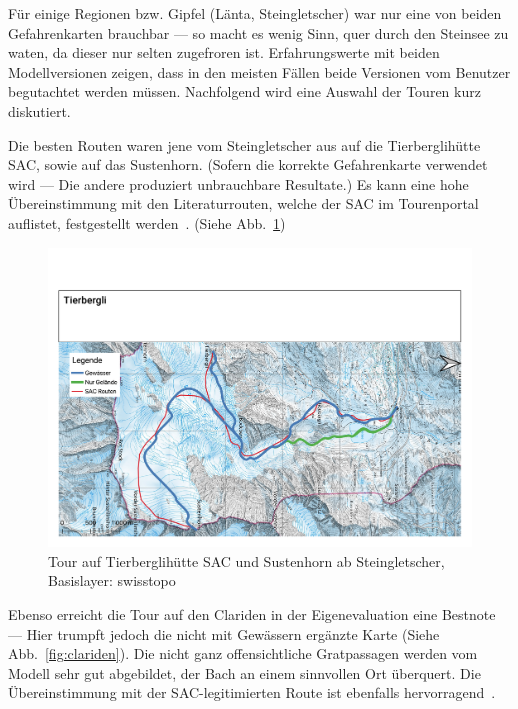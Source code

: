 Für einige Regionen bzw. Gipfel (Länta, Steingletscher) war nur eine von beiden Gefahrenkarten brauchbar --- so macht es wenig Sinn, quer durch den Steinsee zu waten, da dieser nur selten zugefroren ist. Erfahrungswerte mit beiden Modellversionen zeigen, dass in den meisten Fällen beide Versionen vom Benutzer begutachtet werden müssen.
Nachfolgend wird eine Auswahl der Touren kurz diskutiert.

Die besten Routen waren jene vom Steingletscher aus auf die Tierberglihütte SAC, sowie auf das Sustenhorn. (Sofern die korrekte Gefahrenkarte verwendet wird --- Die andere produziert unbrauchbare Resultate.) Es kann eine hohe Übereinstimmung mit den Literaturrouten, welche der SAC im Tourenportal auflistet, festgestellt werden~\cite{mmzentralch}. (Siehe Abb.\ \ref{fig:tierbergli})

\begin{figure}[ht]
  \centering
  \includegraphics[page=1,width=.9\linewidth]{./../evaluation/PDFs/Tierbergli.pdf}
  \caption{Tour auf Tierberglihütte SAC und Sustenhorn ab Steingletscher, \\Basislayer: swisstopo}\label{fig:tierbergli}
\end{figure}


Ebenso erreicht die Tour auf den Clariden in der Eigenevaluation eine Bestnote --- Hier trumpft jedoch die nicht mit Gewässern ergänzte Karte (Siehe Abb.\ \ref{fig:clariden}). Die nicht ganz offensichtliche Gratpassagen werden vom Modell sehr gut abgebildet, der Bach an einem sinnvollen Ort überquert. Die Übereinstimmung mit der SAC-legitimierten Route ist ebenfalls hervorragend~\cite{twslstgallappzll}.

